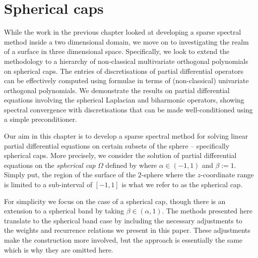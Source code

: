 

\chapter{Spherical caps}\label{CHAPTER:sphericalcaps}

While the work in the previous chapter looked at developing a sparse spectral method inside a two dimensional domain, we move on to investigating the realm of a surface in three dimensional space. Specifically, we look to extend the methodology to a hierarchy of non-classical multivariate orthogonal polynomials on spherical caps. The entries of discretisations of partial differential operators can be effectively computed using formulae in terms of (non-classical) univariate orthogonal polynomials. We demonstrate the results on partial differential equations involving the spherical Laplacian and biharmonic operators, showing spectral convergence with discretisations that can be made well-conditioned using a simple preconditioner. 

Our aim in this chapter is to develop a sparse spectral method for solving linear partial differential equations on certain subsets of the sphere -- specifically spherical caps. More precisely, we consider the solution of partial differential equations on the \textit{spherical cap} $\Omega$ defined by
where $\alpha \in (-1,1)$ and $\beta := 1$. Simply put, the region of the surface of the $2$-sphere where the $z$-coordinate range is limited to a sub-interval of $[-1,1]$ is what we refer to as the spherical cap.

\begin{remark}
For simplicity we focus on the case of a spherical cap, though there is an extension to a spherical band by taking $\beta \in (\alpha,1)$. The methods presented here translate to the spherical band case by including the necessary adjustments to the weights and recurrence relations we present in this paper. These adjustments make the construction more involved, but the approach is essentially the same which is why they are omitted here.
\end{remark}

